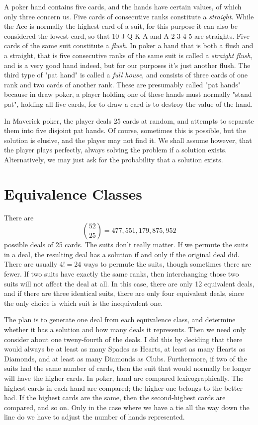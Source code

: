 \documentclass [12pt, letterpaper] {article}
\begin{document}
A poker hand contains five cards, and the hands have certain values, of which only three concern us.
Five cards of consecutive ranks constitute a \textit{straight}.  While the Ace is normally the highest 
card of a suit, for this purpose it can also be considered the lowest card, so that 10 J Q K A and A 2 3 4 5
are straights.  Five cards of the same suit  constitute a \textit{flush}.  In poker a hand that is both a
flush and a straight, that is five consecutive ranks of the same suit is called a \textit{straight flush}, 
and is a very good hand indeed, but for our purposes it's just another flush.  The third type
of "pat hand" is called a \textit{full house}, and consists of three cards of one rank and two cards of another rank.
These are presumably called "pat hands" because in draw poker, a player holding one of these
hands must normally "stand pat", holding all five cards, for to draw a card is to destroy the 
value of the hand.

In Maverick poker, the player deals 25 cards at random, and attempts to separate them into five disjoint pat hands.
Of course, sometimes this is possible, but the solution is elusive, and the player may not find it.
We shall assume however, that the player plays perfectly, always solving the problem if a solution exists.  
Alternatively, we may just ask for the probability that a solution exists.

\section*{Equivalence Classes}
There are \[\binom{52}{25}=477,551,179,875,952\] possible deals of 25 cards.  The suits don't really matter.  
If we permute the suits in a deal, the resulting deal has a solution if and only if the original deal did.  There are usually $4! =24$ ways to 
permute the suits, though sometimes there are fewer.  If two suits have exactly the same ranks, then interchanging those
two suits will not affect the deal at all.  In this case, there are only 12 equivalent deals, and if there are three identical suits, 
there are only four equivalent deals, since the only choice is which suit is the inequivalent one.

The plan is to generate one deal from each equivalence class, and determine whether it has a solution and how many deals it represents.
Then we need only consider about one tweny-fourth of the deals.  I did this by deciding that there would always be at least
as many Spades as Hearts, at least as many Hearts as Diamonds, and at least as many Diamonds as Clubs.  Furthermore,
if two of the suits had the same number of cards, then the suit that would normally be longer
will have the higher cards.  In poker, hand are compared lexicographically.  The highest cards in each hand are compared; the higher one belongs to the 
better had.  If the highest cards are the same, then the second-highest cards are compared, and so on.  Only
in the case where we have a tie all the way down the line do we have to adjust the number of hands represented.
\end{document}
